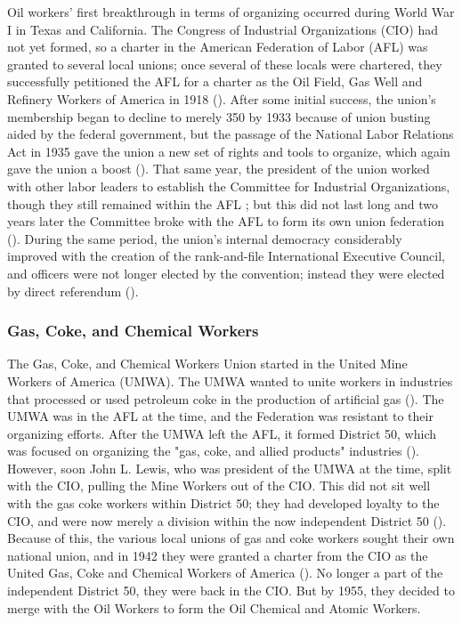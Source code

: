 \documentclass[12pt]{article}
\begin{document}
Oil workers’ first breakthrough in terms of organizing occurred during World War I in Texas and California. The Congress of Industrial Organizations (CIO) had not yet formed, so a charter in the American Federation of Labor (AFL) was granted to several local unions; once several of these locals were chartered, they successfully petitioned the AFL for a charter as the Oil Field, Gas Well and Refinery Workers of America in 1918 (\cite[48]{ocawFactBookOil1960}). After some initial success, the union’s membership began to decline to merely 350 by 1933 because of union busting aided by the federal government, but the passage of the National Labor Relations Act in 1935 gave the union a new set of rights and tools to organize, which again gave the union a boost (\cite[49]{ocawFactBookOil1960}). That same year, the president of the union worked with other labor leaders to establish the Committee for Industrial Organizations, though they still remained within the AFL ; but this did not last long and two years later the Committee broke with the AFL to form its own union federation (\cite[49]{ocawFactBookOil1960}). During the same period, the union’s internal democracy considerably improved with the creation of the rank-and-file International Executive Council, and officers were not longer elected by the convention; instead they were elected by direct referendum (\cite[49--50]{ocawFactBookOil1960}).

\subsubsection{Gas, Coke, and Chemical Workers}

The Gas, Coke, and Chemical Workers Union started in the United Mine Workers of America (UMWA). The UMWA wanted to unite workers in industries that processed or used petroleum coke in the production of artificial gas (\cite[50]{ocawFactBookOil1960}). The UMWA was in the AFL at the time, and the Federation was resistant to their organizing efforts. After the UMWA left the AFL, it formed District 50, which was focused on organizing the "gas, coke, and allied products" industries (\cite[50--51]{ocawFactBookOil1960}). However, soon John L. Lewis, who was president of the UMWA at the time, split with the CIO, pulling the Mine Workers out of the CIO. This did not sit well with the gas coke workers within District 50; they had developed loyalty to the CIO, and were now merely a division within the now independent District 50 (\cite[51]{ocawFactBookOil1960}). Because of this, the various local unions of gas and coke workers sought their own national union, and in 1942 they were granted a charter from the CIO as the United Gas, Coke and Chemical Workers of America (\cite[51]{ocawFactBookOil1960}). No longer a part of the independent District 50, they were back in the CIO.  But by 1955, they decided to merge with the Oil Workers to form the Oil Chemical and Atomic Workers.
\end{document}

